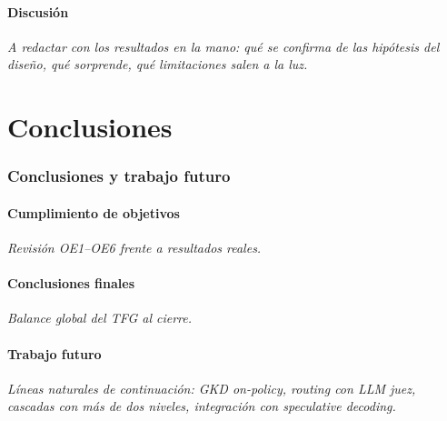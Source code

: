 \documentclass[11pt,a4paper]{article}
\begin{document}
\subsection{Discusión}

\textit{A redactar con los resultados en la mano: qué se confirma de las hipótesis del diseño, qué sorprende, qué limitaciones salen a la luz.}

\part{Conclusiones}
\label{part:conclusiones}

\section{Conclusiones y trabajo futuro}
\label{sec:conclusiones-futuro}

\subsection{Cumplimiento de objetivos}

\textit{Revisión OE1--OE6 frente a resultados reales.}

\subsection{Conclusiones finales}

\textit{Balance global del TFG al cierre.}

\subsection{Trabajo futuro}

\textit{Líneas naturales de continuación: GKD on-policy, routing con LLM juez, cascadas con más de dos niveles, integración con speculative decoding.}
\end{document}
